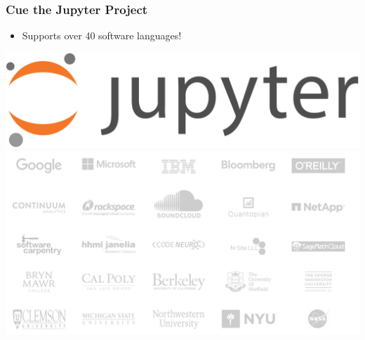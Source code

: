 \documentclass[xcolor={dvipsnames}]{beamer}
\newcommand{\ft}{\frametitle}
\newcommand{\bi}{\begin{itemize}}
\newcommand{\ei}{\end{itemize}}
\begin{document}
\begin{frame}
\ft{Cue the Jupyter Project}
\bi
	\item Supports over 40 software languages!
\ei
\begin{center}
	\includegraphics[width = .5\textwidth]{rectanglelogo-greytext-orangebody-greymoons.png} \\ \vspace{.2in}
	\includegraphics[width = .5\textwidth]{InUseAt.PNG}
\end{center}
\end{frame}
\end{document}
